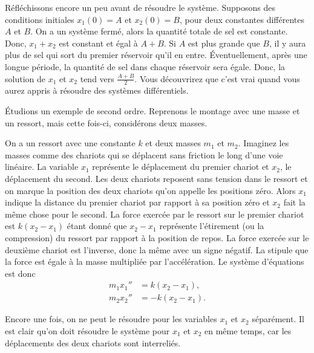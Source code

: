 \begin{example}
Réfléchissons encore un peu avant de résoudre le système. Supposons des conditions initiales $x_1(0) = A$ et $x_2(0) = B$, pour deux constantes différentes $A$ et $B$.  On a un système fermé, alors la quantité totale de sel est constante. Donc, $x_1+x_2$ est constant et égal à $A+B$.
Si $A$ est plus grande que $B$, il y aura plus de sel qui sort du premier réservoir qu’il en entre. Éventuellement, après une longue période, la quantité de sel dans chaque réservoir sera égale. Donc, la solution de $x_1$ et $x_2$ tend vers $\frac{A+B}{2}$.  Vous découvrirez que c'est vrai quand vous aurez appris à résoudre des systèmes différentiels.
\end{example}

\begin{example} \label{sintro:carts-example}
Étudions un exemple de second ordre. Reprenons le montage avec une masse et un ressort, mais cette fois-ci, considérons deux masses.

\begin{mywrapfigsimp}{2.0in}{2.3in}
\noindent
{}
\end{mywrapfigsimp}
On a un ressort avec une constante $k$ et deux masses $m_1$
et $m_2$. Imaginez les masses comme des chariots qui se déplacent sans friction le long d'une voie linéaire. La variable $x_1$ représente le déplacement du premier chariot et $x_2$, le déplacement du second. Les deux chariots reposent sans tension dans le ressort et on marque la position des deux chariots qu'on appelle les positions zéro. Alors $x_1$ indique la distance du premier chariot par rapport à sa position zéro et $x_2$ fait la même chose pour le second. La force exercée par le ressort sur le premier chariot est
$k(x_2-x_1)$ étant donné que 
$x_2-x_1$ représente l’étirement (ou la compression) du ressort par rapport à la position de repos. La force exercée sur le deuxième chariot est l'inverse, donc la même avec un signe négatif. La 
 stipule que la force est égale à la masse multipliée par l’accélération. Le système d’équations est donc
\begin{align*}
m_1 x_1'' & = k(x_2-x_1) , \\
m_2 x_2'' & = - k(x_2-x_1) .
\end{align*}

Encore une fois, on ne peut le résoudre pour les variables $x_1$ et $x_2$ séparément. Il est clair qu'on doit résoudre le système pour $x_1$ et $x_2$ en même temps, car les déplacements des deux chariots sont interreliés.
\end{example}

